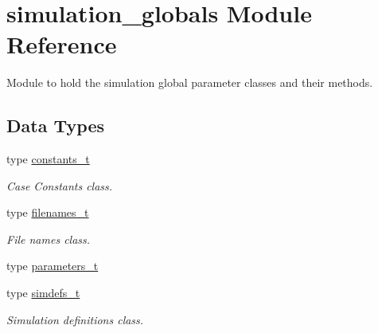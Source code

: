 \hypertarget{namespacesimulation__globals}{}\section{simulation\+\_\+globals Module Reference}
\label{namespacesimulation__globals}


Module to hold the simulation global parameter classes and their methods.  


\subsection*{Data Types}
\begin{DoxyCompactItemize}
\item 
type \hyperlink{structsimulation__globals_1_1constants__t}{constants\+\_\+t}
\begin{DoxyCompactList}\small\item\em Case Constants class. \end{DoxyCompactList}\item 
type \hyperlink{structsimulation__globals_1_1filenames__t}{filenames\+\_\+t}
\begin{DoxyCompactList}\small\item\em File names class. \end{DoxyCompactList}\item 
type \hyperlink{structsimulation__globals_1_1parameters__t}{parameters\+\_\+t}
\item 
type \hyperlink{structsimulation__globals_1_1simdefs__t}{simdefs\+\_\+t}
\begin{DoxyCompactList}\small\item\em Simulation definitions class. \end{DoxyCompactList}\end{DoxyCompactItemize}

